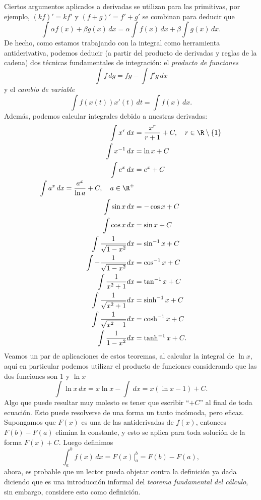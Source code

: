 \documentclass[11pt,oneside,a4paper]{book}
\begin{document}
Ciertos argumentos aplicados a derivadas se utilizan para las primitivas, por ejemplo, $(kf)'=kf'$ y $(f+g)'=f'+g'$ se combinan para deducir que
\begin{equation}
\int\alpha f(x)+\beta g(x)\,dx=\alpha\int f(x)\,dx+\beta\int g(x)\,dx.
\end{equation}
De hecho, como estamos trabajando con la integral como herramienta antiderivativa, podemos deducir (a partir del producto de derivadas y reglas de la cadena) dos técnicas fundamentales de integración: el \textit{producto de funciones}
\begin{equation}
\int f\,dg=fg-\int f'g\,dx
\end{equation}
y el \textit{cambio de variable}
\begin{equation}
\int f(x(t))x'(t)\,dt=\int f(x)\,dx.
\end{equation}
Además, podemos calcular integrales debido a nuestras derivadas:
\begingroup
\allowdisplaybreaks
\begin{align}
\int x^r\,dx&=\frac{x^r}{r+1}+C,\quad r\in\R\setminus\{1\}\\
\int x^{-1}\,dx&=\ln x+C\\
\int e^x\,dx&=e^x+C\\
\int a^x\,dx=\frac{a^x}{\ln a}+C,\quad a\in\R^+\\
\int\sin x\,dx&=-\cos x+C\\
\int\cos x\,dx&=\sin x+C\\
\int\frac{1}{\sqrt{1-x^2}}dx&=\sin^{-1}x+C\\
\int-\frac{1}{\sqrt{1-x^2}}dx&=\cos^{-1}x+C\\
\int\frac{1}{x^2+1}dx&=\tan^{-1}x+C\\
\int\frac{1}{\sqrt{x^2+1}}dx&=\sinh^{-1}x+C\\
\int\frac{1}{\sqrt{x^2-1}}dx&=\cosh^{-1}x+C\\
\int\frac{1}{1-x^2}dx&=\tanh^{-1}x+C.
\end{align}
\endgroup
Veamos un par de aplicaciones de estos teoremas, al calcular la integral de $\ln x$, aquí en particular podemos utilizar el producto de funciones considerando que las dos funciones son 1 y $\ln x$
\begin{equation}
\int\ln x\,dx=x\ln x-\int\,dx=x(\ln x-1)+C.
\end{equation}
Algo que puede resultar muy molesto es tener que escribir ``$+C$'' al final de toda ecuación. Esto puede resolverse de una forma un tanto incómoda, pero eficaz. Supongamos que $F(x)$ es una de las antiderivadas de $f(x)$, entonces $F(b)-F(a)$ elimina la constante, y esto se aplica para toda solución de la forma $F(x)+C$. Luego definimos
$$\int_a^bf(x)\,dx=\left.F(x)\right|_a^b=F(b)-F(a),$$
ahora, es probable que un lector pueda objetar contra la definición ya dada diciendo que es una introducción informal del \textit{teorema fundamental del cálculo}, sin embargo, considere esto como definición.
\end{document}
